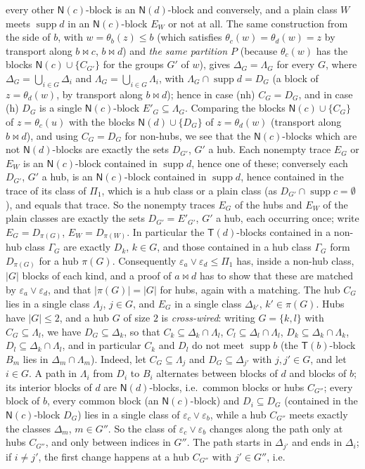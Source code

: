 \documentclass[11pt]{amsart}
\theoremstyle{definition}
\newcommand{\supp}{\operatorname{supp}}
\newcommand{\T}{\mathsf{T}}
\newcommand{\N}{\mathsf{N}}
\newcommand{\mt}{\bowtie}   %
\begin{document}
every other $\N(c)$-block is an $\N(d)$-block and conversely, and a plain class $W$ meets $\supp d$ in an $\N(c)$-block $E_W$ or not at all. The same construction from the side of $b$, with $w=\theta_b(z)\le b$ (which satisfies $\theta_c(w)=\theta_d(w)=z$ by transport along $b\mt c$, $b\mt d$) and \emph{the same partition $P$} (because $\theta_c(w)$ has the blocks $\N(c)\cup\{C_{G'}\}$ for the groups $G'$ of $w$), gives $\Delta_G=\Lambda_G$ for every $G$, where $\Delta_G=\bigcup_{i\in G}\Delta_i$ and $\Lambda_G=\bigcup_{i\in G}\Lambda_i$, with $\Lambda_G\cap\supp d=D_G$ (a block of $z=\theta_d(w)$, by transport along $b\mt d$); hence in case (nh) $C_G=D_G$, and in case (h) $D_G$ is a single $\N(c)$-block $E'_G\subseteq\Lambda_G$. Comparing the blocks $\N(c)\cup\{C_G\}$ of $z=\theta_c(u)$ with the blocks $\N(d)\cup\{D_G\}$ of $z=\theta_d(w)$ (transport along $b\mt d$), and using $C_G=D_G$ for non-hubs, we see that the $\N(c)$-blocks which are not $\N(d)$-blocks are exactly the sets $D_{G'}$, $G'$ a hub. Each nonempty trace $E_G$ or $E_W$ is an $\N(c)$-block contained in $\supp d$, hence one of these; conversely each $D_{G'}$, $G'$ a hub, is an $\N(c)$-block contained in $\supp d$, hence contained in the trace of its class of $\Pi_1$, which is a hub class or a plain class (as $D_{G'}\cap\supp c=\emptyset$), and equals that trace. So the nonempty traces $E_G$ of the hubs and $E_W$ of the plain classes are exactly the sets $D_{G'}=E'_{G'}$, $G'$ a hub, each occurring once; write $E_G=D_{\pi(G)}$, $E_W=D_{\pi(W)}$. In particular the $\T(d)$-blocks contained in a non-hub class $\Gamma_G$ are exactly $D_k$, $k\in G$, and those contained in a hub class $\Gamma_G$ form $D_{\pi(G)}$ for a hub $\pi(G)$. Consequently $\varepsilon_a\vee\varepsilon_d\le\Pi_1$ has, inside a non-hub class, $|G|$ blocks of each kind, and a proof of $a\mt d$ has to show that these are matched by $\varepsilon_a\vee\varepsilon_d$, and that $|\pi(G)|=|G|$ for hubs, again with a matching. The hub $C_G$ lies in a single class $\Lambda_j$, $j\in G$, and $E_G$ in a single class $\Delta_{k'}$, $k'\in\pi(G)$. Hubs have $|G|\le2$, and a hub $G$ of size $2$ is \emph{cross-wired}: writing $G=\{k,l\}$ with $C_G\subseteq\Lambda_l$, we have $D_G\subseteq\Delta_k$, so that $C_k\subseteq\Delta_k\cap\Lambda_l$, $C_l\subseteq\Delta_l\cap\Lambda_l$, $D_k\subseteq\Delta_k\cap\Lambda_k$, $D_l\subseteq\Delta_k\cap\Lambda_l$, and in particular $C_k$ and $D_l$ do not meet $\supp b$ (the $\T(b)$-block $B_m$ lies in $\Delta_m\cap\Lambda_m$). Indeed, let $C_G\subseteq\Lambda_j$ and $D_G\subseteq\Delta_{j'}$ with $j,j'\in G$, and let $i\in G$. A path in $\Lambda_i$ from $D_i$ to $B_i$ alternates between blocks of $d$ and blocks of $b$; its interior blocks of $d$ are $\N(d)$-blocks, i.e.\ common blocks or hubs $C_{G''}$; every block of $b$, every common block (an $\N(c)$-block) and $D_i\subseteq D_G$ (contained in the $\N(c)$-block $D_G$) lies in a single class of $\varepsilon_c\vee\varepsilon_b$, while a hub $C_{G''}$ meets exactly the classes $\Delta_m$, $m\in G''$. So the class of $\varepsilon_c\vee\varepsilon_b$ changes along the path only at hubs $C_{G''}$, and only between indices in $G''$. The path starts in $\Delta_{j'}$ and ends in $\Delta_i$; if $i\ne j'$, the first change happens at a hub $C_{G''}$ with $j'\in G''$, i.e.\ 
\end{document}
